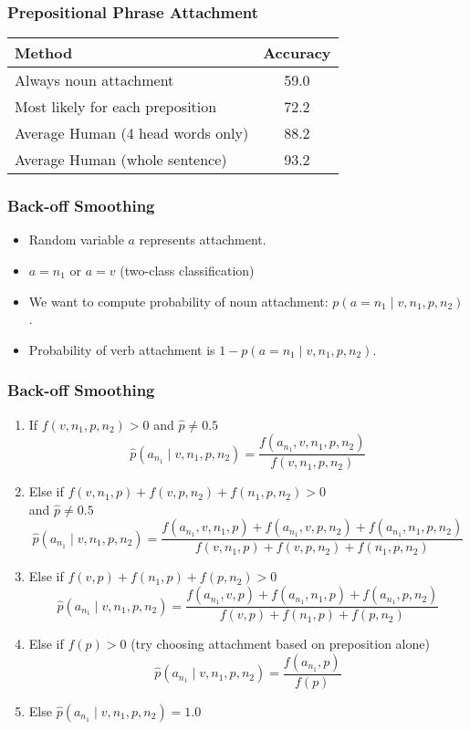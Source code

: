 \begin{frame}
\frametitle{Prepositional Phrase Attachment}
\begin{tabular}{|l|c|}  \hline
Method & Accuracy \\ \hline
Always noun attachment & 59.0 \\
Most likely for each preposition & 72.2 \\
Average Human (4 head words only) & 88.2 \\
Average Human (whole sentence) & 93.2 \\  \hline
\end{tabular}

\end{frame}

\begin{frame}
\frametitle{Back-off Smoothing}
\begin{itemize}[<+->]
\item Random variable $a$ represents attachment. 
\item $a = n_1$ or $a = v$ (two-class classification)
\item We want to compute probability of noun attachment: $p(a = n_1 \mid v, n_1, p, n_2)$. 
\item Probability of verb attachment is $1 - p(a = n_1 \mid v, n_1, p, n_2)$.
\end{itemize}
\end{frame}

\begin{frame}
\frametitle{Back-off Smoothing}
\begin{enumerate}
\item<1-> If $f(v,n_1,p,n_2) > 0$ and $\hat{p} \neq 0.5$
{\small
\[ \hat{p}(a_{n_1} \mid  v,n_1,p,n_2) = \frac{ f(a_{n_1},v,n_1,p,n_2) }{ f(v,n_1,p,n_2)
} \]
}
\item<2-> Else if $f(v,n_1,p) + f(v,p,n_2) + f(n_1,p,n_2) > 0$ \\
and $\hat{p} \neq 0.5$
{\small
\[ \hat{p}(a_{n_1} \mid  v,n_1,p,n_2) = \frac{ f(a_{n_1},v,n_1,p) + f(a_{n_1},v,p,n_2) +
  f(a_{n_1},n_1,p,n_2) }{ f(v,n_1,p) + f(v,p,n_2) + f(n_1,p,n_2) } \]
  }
\item<3-> Else if $f(v,p) + f(n_1,p) + f(p,n_2) > 0$
{\small
\[ \hat{p}(a_{n_1} \mid  v,n_1,p,n_2) = \frac{ f(a_{n_1},v,p) + f(a_{n_1},n_1,p) +
  f(a_{n_1},p,n_2) }{ f(v,p) + f(n_1,p) + f(p,n_2) } \]
}
\item<4-> Else if $f(p) > 0$ (try choosing attachment based on preposition alone)
{\small
\[ \hat{p}(a_{n_1} \mid  v,n_1,p,n_2) = \frac{ f(a_{n_1},p) }{ f(p) } \]
}\item<5-> Else {\small
\( \hat{p}(a_{n_1} \mid  v,n_1,p,n_2) = 1.0 \)
}
\end{enumerate}
\end{frame}

